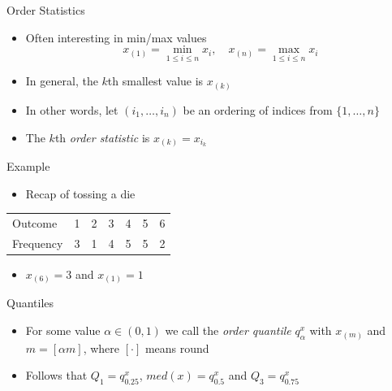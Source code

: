 \documentclass{beamer}
\begin{document}
\begin{frame}{Order Statistics}  
\begin{itemize} 
 \item Often interesting in min/max values 
 \begin{displaymath} 
  x_{(1)} = \min_{1 \leq i \leq n} x_i, \quad x_{(n)} = \max_{1 \leq i \leq n} x_i
 \end{displaymath}
\item In general, the $k$th smallest value is $x_{(k)}$ 
\item In other words, let $(i_1, \ldots, i_n)$ be an ordering of indices from $\{1, \ldots, n\}$ 
\item The $k$th \emph{order statistic} is $x_{(k)} = x_{i_k}$
\end{itemize}
\end{frame}

\begin{frame}{Example}  
\begin{itemize} 
 \item Recap of tossing a die 
\end{itemize}

\begin{table}
  \begin{tabular}{l | l l l l l l }
\hline 
  Outcome & 1 & 2 & 3 & 4 & 5 & 6 \\ 
  Frequency & 3 & 1 & 4 & 5 & 5 & 2 \\
\hline 
  \end{tabular} 
\end{table}
\begin{itemize} 
 \item $x_{(6)} = 3$ and $x_{(1)} = 1$
\end{itemize}
\end{frame}

\begin{frame}{Quantiles} 
\begin{itemize} 
 \item For some value $\alpha \in (0, 1)$ we call the \emph{order quantile} $q_\alpha^x$ with $x_{(m)}$ and $m = [\alpha m]$, where $[\cdot]$ means round
 \item Follows that $Q_1 = q_{0.25}^x$, $med(x) = q_{0.5}^x$ and $Q_3 = q_{0.75}^x$
\end{itemize}
\end{frame}
\end{document}
